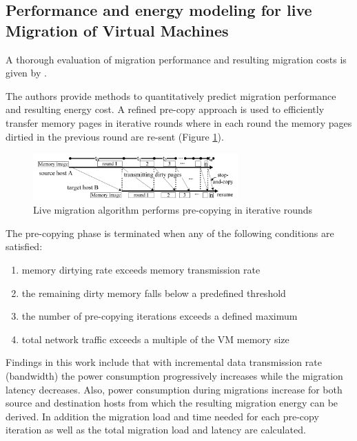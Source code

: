 \subsection{Performance and energy modeling for live Migration of Virtual Machines} \label{ssec:performance_and_energy_modeling_of_virtual_machines}

A thorough evaluation of migration performance and resulting migration costs is given by \cite{liu2013performance}. 

The authors provide methods to quantitatively predict migration performance and resulting energy cost. A refined pre-copy approach is used to efficiently transfer memory pages in iterative rounds where in each round the memory pages dirtied in the previous round are re-sent (Figure \ref{fig:VM_migration_precopy}). 

\begin{figure}[htbp]
	\centering
		\includegraphics[width=0.7\textwidth]{figures/state_of_the_art/VM_migration_precopy.PNG}
	\caption{Live migration algorithm performs pre-copying in iterative rounds \cite{liu2013performance}}
	\label{fig:VM_migration_precopy}
\end{figure}

The pre-copying phase is terminated when any of the following conditions are satisfied:

\begin{enumerate}
	\item [1)] memory dirtying rate exceeds memory transmission rate
	\item [2)] the remaining dirty memory falls below a predefined threshold
	\item [3)] the number of pre-copying iterations exceeds a defined maximum
	\item [4)] total network traffic exceeds a multiple of the VM memory size
\end{enumerate}

Findings in this work include that with incremental data transmission rate (bandwidth) the power consumption progressively increases while the migration latency decreases. Also, power consumption during migrations increase for both source and destination hosts from which the resulting migration energy can be derived. In addition the migration load and time needed for each pre-copy iteration as well as the total migration load and latency are calculated. 

